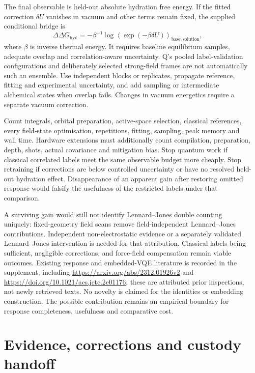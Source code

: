 \documentclass{article}
\begin{document}
The final observable is held-out absolute hydration free energy. If the fitted correction $\delta U$ vanishes in vacuum and other terms remain fixed, the supplied conditional bridge is
\begin{equation*}
\Delta\Delta G_{\mathrm{hyd}}=-\beta^{-1}\log\left\langle\exp(-\beta\delta U)\right\rangle_{\mathrm{base,solution}},
\end{equation*}
where $\beta$ is inverse thermal energy. It requires baseline equilibrium samples, adequate overlap and correlation-aware uncertainty. Q's pooled label-validation configurations and deliberately selected strong-field frames are not automatically such an ensemble. Use independent blocks or replicates, propagate reference, fitting and experimental uncertainty, and add sampling or intermediate alchemical states when overlap fails. Changes in vacuum energetics require a separate vacuum correction.

Count integrals, orbital preparation, active-space selection, classical references, every field-state optimisation, repetitions, fitting, sampling, peak memory and wall time. Hardware extensions must additionally count compilation, preparation, depth, shots, actual covariance and mitigation bias. Stop quantum work if classical correlated labels meet the same observable budget more cheaply. Stop retraining if corrections are below controlled uncertainty or have no resolved held-out hydration effect. Disappearance of an apparent gain after restoring omitted response would falsify the usefulness of the restricted labels under that comparison.

A surviving gain would still not identify Lennard--Jones double counting uniquely: fixed-geometry field scans remove field-independent Lennard--Jones contributions. Independent non-electrostatic evidence or a separately validated Lennard--Jones intervention is needed for that attribution. Classical labels being sufficient, negligible corrections, and force-field compensation remain viable outcomes. Existing response and embedded-VQE literature is recorded in the supplement, including \url{https://arxiv.org/abs/2312.01926v2} and \url{https://doi.org/10.1021/acs.jctc.2c01176}; these are attributed prior inspections, not newly retrieved texts. No novelty is claimed for the identities or embedding construction. The possible contribution remains an empirical boundary for response completeness, usefulness and comparative cost.

\appendix
\section{Evidence, corrections and custody handoff}
\end{document}
